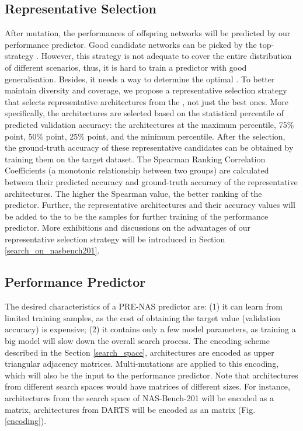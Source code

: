 \documentclass[sigconf]{acmart}
\begin{document}
\subsection{Representative Selection}
After mutation, the performances of offspring networks will be predicted by our performance predictor. Good candidate networks can be picked by the top- strategy \cite{Ref:40,Ref:31,Ref:41}.  However, this strategy is not adequate to cover the entire distribution of different scenarios, thus, it is hard to train a predictor with good generalisation. Besides, it needs a way to determine the optimal .  To better maintain diversity and coverage, we propose a representative selection strategy that selects representative architectures from the , not just the best ones.  More specifically, the architectures are selected based on the statistical percentile of predicted validation accuracy: the architectures at the maximum percentile, 75\% point, 50\% point, 25\% point, and the minimum percentile. After the selection, the ground-truth accuracy of these representative candidates can be obtained by training them on the target dataset. The Spearman Ranking Correlation Coefficients (a monotonic relationship between two groups) are calculated between their predicted accuracy and ground-truth accuracy of the representative architectures. The higher the Spearman value, the better ranking of the predictor. Further, the representative architectures and their accuracy values will be added to the  to be the samples for further training of the performance predictor. More exhibitions and discussions on the advantages of our representative selection strategy will be introduced in Section \ref{search_on_nasbench201}.



\subsection{Performance Predictor}
\label{sec-predictor}
The desired characteristics of a PRE-NAS predictor are: (1) it can learn from limited training samples, as the cost of obtaining the target value (validation accuracy) is expensive; (2) it contains only a few model parameters, as training a big model will slow down the overall search process.
The encoding scheme described in the Section \ref{search_space}, architectures are encoded as upper triangular adjacency matrices. Multi-mutations are applied to this encoding, which will also be the input to the performance predictor.  Note that architectures from different search spaces would have matrices of different sizes.  For instance, architectures from the search space of NAS-Bench-201 will be encoded as a  matrix, architectures from DARTS will be encoded as an  matrix (Fig. \ref{encoding}). 
\end{document}
